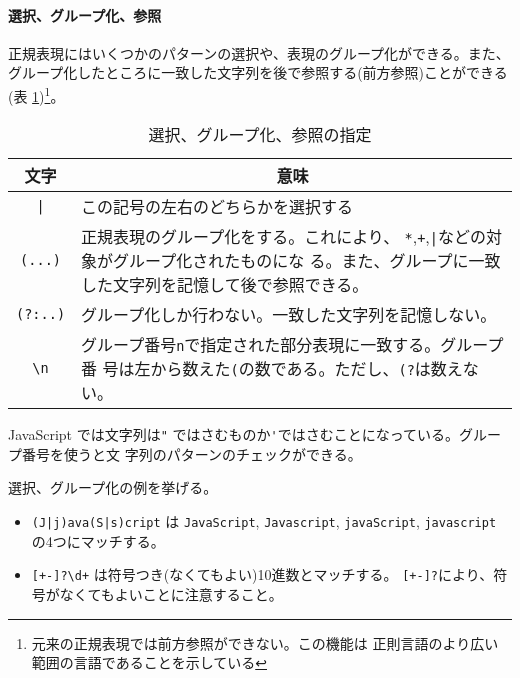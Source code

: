 \paragraph{選択、グループ化、参照}
正規表現にはいくつかのパターンの選択や、表現のグループ化ができる。また、
グループ化したところに一致した文字列を後で参照する(前方参照)ことができる(表
\ref{select})\footnote{元来の正規表現では前方参照ができない。この機能は
正則言語のより広い範囲の言語であることを示している}。
\begin{table}[ht]
\caption{選択、グループ化、参照の指定}\label{select}
\begin{center}
 \begin{tabular}{|c|m{}|}\hline
  文字&\multicolumn{1}{c|}{意味}\\\hline
\verb+|+&この記号の左右のどちらかを選択する\\\hline
\verb+(...)+&正規表現のグループ化をする。これにより、
      \verb-*-,\verb-+-,\verb-|-などの対象がグループ化されたものにな
      る。また、グループに一致した文字列を記憶して後で参照できる。\\\hline
\verb+(?:..)+&グループ化しか行わない。一致した文字列を記憶しない。\\\hline
\verb+\n+&グループ番号\verb+n+で指定された部分表現に一致する。グループ番
      号は左から数えた\verb+(+の数である。ただし、\verb+(?+は数えない。\\\hline
\end{tabular}
\end{center}
\end{table}

JavaScript では文字列は\verb+"+%
ではさむものか\verb+'+ではさむことになっている。グループ番号を使うと文
字列のパターンのチェックができる。
\begin{Exec}
選択、グループ化の例を挙げる。
\begin{itemize}\upshape
 \item \verb-(J|j)ava(S|s)cript- は 
\verb-JavaScript-, 
\verb-Javascript-,
\verb-javaScript-,
\verb-javascript- の4つにマッチする。
 \item \verb/[+-]?\d+/ は符号つき(なくてもよい)10進数とマッチする。
\verb/[+-]?/により、符号がなくてもよいことに注意すること。
\end{itemize}
\end{Exec}
